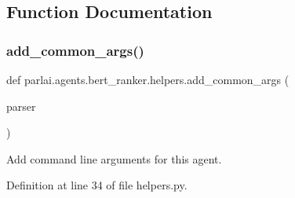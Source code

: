 \subsection{Function Documentation}
\mbox{\label{namespaceparlai_1_1agents_1_1bert__ranker_1_1helpers_ac2e926c3aba3a62be09e2c37dffcaee2}} 
\subsubsection{\texorpdfstring{add\+\_\+common\+\_\+args()}{add\_common\_args()}}
{\footnotesize\ttfamily def parlai.\+agents.\+bert\+\_\+ranker.\+helpers.\+add\+\_\+common\+\_\+args (\begin{DoxyParamCaption}\item[{}]{parser }\end{DoxyParamCaption})}

\begin{DoxyVerb}Add command line arguments for this agent.
\end{DoxyVerb}
 

Definition at line 34 of file helpers.\+py.


